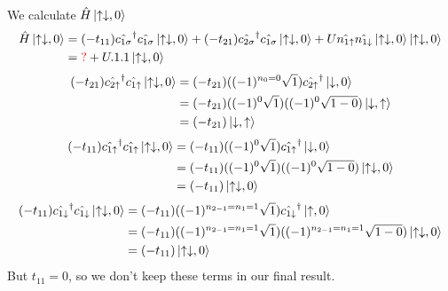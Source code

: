 We calculate $\hat{H}\left\lvert \uparrow\downarrow,0\right\rangle$
$$
\begin{aligned}
\hat{H}\left\lvert \uparrow\downarrow,0\right\rangle&=(-t_{11})\hat{c_{1\sigma}}^{\dagger}\hat{c_{1\sigma}}\left\lvert \uparrow\downarrow,0\right\rangle+(-t_{21})\hat{c_{2\sigma}}^{\dagger}\hat{c_{1\sigma}}\left\lvert \uparrow\downarrow,0\right\rangle+U\hat{n_{1\uparrow}}\hat{n_{1\downarrow}}\left\lvert \uparrow\downarrow,0\right\rangle\left\lvert \uparrow\downarrow,0\right\rangle\\
&={\color{red}?}+U.1.1\left\lvert \uparrow\downarrow,0\right\rangle
\end{aligned}
$$
$$
\begin{aligned}
(-t_{21})\hat{c_{2\uparrow}}^{\dagger}\hat{c_{1\uparrow}}\left\lvert \uparrow\downarrow,0\right\rangle&=(-t_{21})((-1)^{n_0=0}\sqrt{1})\hat{c_{2\uparrow}}^{\dagger}\left\lvert \downarrow,0\right\rangle\\
&=(-t_{21})((-1)^{0}\sqrt{1})((-1)^0\sqrt{1-0})\left\lvert \downarrow,\uparrow\right\rangle\\
&=(-t_{21})\left\lvert \downarrow,\uparrow\right\rangle
\end{aligned}
$$
$$
\begin{aligned}
	(-t_{11})\hat{c_{1\uparrow}}^{\dagger}\hat{c_{1\uparrow}}\left\lvert \uparrow\downarrow,0\right\rangle&=(-t_{11})((-1)^{0}\sqrt{1})\hat{c_{1\uparrow}}^{\dagger}\left\lvert \downarrow,0\right\rangle\\
	&=(-t_{11})((-1)^{0}\sqrt{1})((-1)^{0}\sqrt{1-0})\left\lvert \uparrow\downarrow,0\right\rangle\\
	&=(-t_{11})\left\lvert \uparrow\downarrow,0\right\rangle
\end{aligned}
$$
$$
\begin{aligned}
	(-t_{11})\hat{c_{1\downarrow}}^{\dagger}\hat{c_{1\downarrow}}\left\lvert \uparrow\downarrow,0\right\rangle&=(-t_{11})((-1)^{n_{2-1}=n_1=1}\sqrt{1})\hat{c_{1\downarrow}}^{\dagger}\left\lvert \uparrow,0\right\rangle\\
	&=(-t_{11})((-1)^{n_{2-1}=n_1=1}\sqrt{1})((-1)^{n_{2-1}=n_1=1}\sqrt{1-0})\left\lvert \uparrow\downarrow,0\right\rangle\\
	&=(-t_{11})\left\lvert \uparrow\downarrow,0\right\rangle
\end{aligned}
$$
But $t_{11}=0$, so we don't keep these terms in our final result.